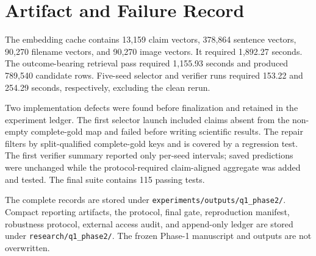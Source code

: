 \section{Artifact and Failure Record}

The embedding cache contains 13,159 claim vectors, 378,864 sentence vectors, 90,270 filename vectors, and 90,270 image vectors. It required 1,892.27 seconds. The outcome-bearing retrieval pass required 1,155.93 seconds and produced 789,540 candidate rows. Five-seed selector and verifier runs required 153.22 and 254.29 seconds, respectively, excluding the clean rerun.

Two implementation defects were found before finalization and retained in the experiment ledger. The first selector launch included claims absent from the non-empty complete-gold map and failed before writing scientific results. The repair filters by split-qualified complete-gold keys and is covered by a regression test. The first verifier summary reported only per-seed intervals; saved predictions were unchanged while the protocol-required claim-aligned aggregate was added and tested. The final suite contains 115 passing tests.

The complete records are stored under \texttt{experiments/outputs/q1\_phase2/}. Compact reporting artifacts, the protocol, final gate, reproduction manifest, robustness protocol, external access audit, and append-only ledger are stored under \texttt{research/q1\_phase2/}. The frozen Phase-1 manuscript and outputs are not overwritten.
